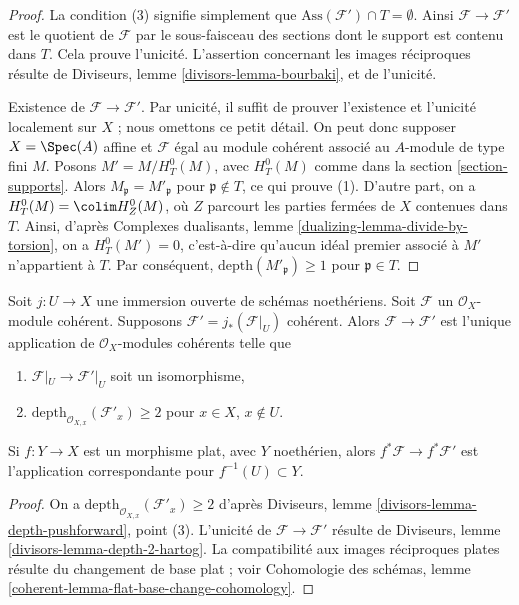 \begin{proof}
La condition (3) signifie simplement que $\text{Ass}(\mathcal{F}') \cap T = \emptyset$. Ainsi $\mathcal{F} \to \mathcal{F}'$ est le quotient de $\mathcal{F}$ par le sous-faisceau des sections dont le support est contenu dans $T$. Cela prouve l'unicité. L'assertion concernant les images réciproques résulte de Diviseurs, lemme \ref{divisors-lemma-bourbaki}, et de l'unicité.

\medskip\noindent
Existence de $\mathcal{F} \to \mathcal{F}'$. Par unicité, il suffit de prouver l'existence et l'unicité localement sur $X$ ; nous omettons ce petit détail. On peut donc supposer $X = \Spec(A)$ affine et $\mathcal{F}$ égal au module cohérent associé au $A$-module de type fini $M$. Posons $M' = M / H^0_T(M)$, avec $H^0_T(M)$ comme dans la section \ref{section-supports}. Alors $M_\mathfrak p = M'_\mathfrak p$ pour $\mathfrak p \not \in T$, ce qui prouve (1). D'autre part, on a $H^0_T(M) = \colim H^0_Z(M)$, où $Z$ parcourt les parties fermées de $X$ contenues dans $T$. Ainsi, d'après Complexes dualisants, lemme \ref{dualizing-lemma-divide-by-torsion}, on a $H^0_T(M') = 0$, c'est-à-dire qu'aucun idéal premier associé à $M'$ n'appartient à $T$. Par conséquent, $\text{depth}(M'_\mathfrak p) \geq 1$ pour $\mathfrak p \in T$.
\end{proof}

\begin{lemma}
\label{lemma-get-depth-2-along-Z}
Soit $j : U \to X$ une immersion ouverte de schémas noethériens. Soit $\mathcal{F}$ un $\mathcal{O}_X$-module cohérent. Supposons $\mathcal{F}' = j_*(\mathcal{F}|_U)$ cohérent. Alors $\mathcal{F} \to \mathcal{F}'$ est l'unique application de $\mathcal{O}_X$-modules cohérents telle que
\begin{enumerate}
\item $\mathcal{F}|_U \to \mathcal{F}'|_U$ soit un isomorphisme,
\item $\text{depth}_{\mathcal{O}_{X, x}}(\mathcal{F}'_x) \geq 2$ pour $x \in X$, $x \not \in U$.
\end{enumerate}
Si $f : Y \to X$ est un morphisme plat, avec $Y$ noethérien, alors $f^*\mathcal{F} \to f^*\mathcal{F}'$ est l'application correspondante pour $f^{-1}(U) \subset Y$.
\end{lemma}

\begin{proof}
On a $\text{depth}_{\mathcal{O}_{X, x}}(\mathcal{F}'_x) \geq 2$ d'après Diviseurs, lemme \ref{divisors-lemma-depth-pushforward}, point (3). L'unicité de $\mathcal{F} \to \mathcal{F}'$ résulte de Diviseurs, lemme \ref{divisors-lemma-depth-2-hartog}. La compatibilité aux images réciproques plates résulte du changement de base plat ; voir Cohomologie des schémas, lemme \ref{coherent-lemma-flat-base-change-cohomology}.
\end{proof}

